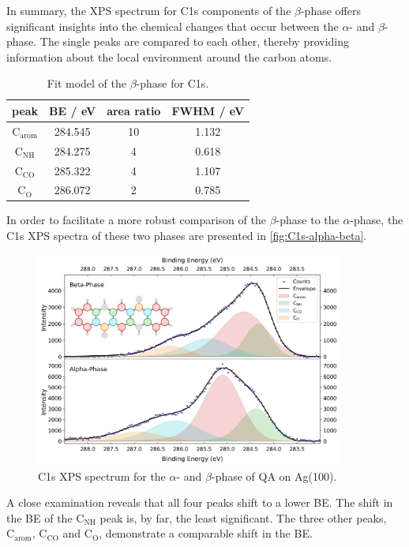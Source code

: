 In summary, the \ac{XPS} spectrum for C1s components of the $\beta$-phase offers significant insights into the chemical changes that occur between the $\alpha$- and $\beta$-phase. The single peaks are compared to each other, thereby providing information about the local environment around the carbon atoms.

\begin{table}[H]
	\centering
	\caption{Fit model of the $\beta$-phase for C1s.}
	\begin{tabular}{|c|c|c|c|}
		\hline
		peak & \ac{BE} / eV & area ratio & FWHM / eV \\
		\hline
		$\mathrm{C_{arom}}$ & 284.545 & 10 & 1.132 \\ \hline
		$\mathrm{C_{NH}}$ & 284.275 & 4 & 0.618 \\ \hline
		$\mathrm{C_{CO}}$ & 285.322 & 4 & 1.107 \\ \hline
		$\mathrm{C_{O}}$ & 286.072 & 2 & 0.785 \\ \hline
	\end{tabular}
	\label{tab:C1s-beta-fit}
\end{table}

In order to facilitate a more robust comparison of the $\beta$-phase to the $\alpha$-phase, the C1s \ac{XPS} spectra of these two phases are presented in \autoref{fig:C1s-alpha-beta}.

\begin{figure}[H]
	\centering
	\includegraphics[width=0.9\textwidth]{images/C1s-phase-comparison.png}
	\caption{C1s \ac{XPS} spectrum for the $\alpha$- and $\beta$-phase  of \ac{QA} on Ag(100).}
	\label{fig:C1s-alpha-beta}
\end{figure}

A close examination reveals that all four peaks shift to a lower \ac{BE}. The shift in the \ac{BE} of the $\mathrm{C_{NH}}$ peak is, by far, the least significant. The three other peaks, $\mathrm{C_{arom}}$, $\mathrm{C_{CO}}$ and $\mathrm{C_{O}}$, demonstrate a comparable shift in the \ac{BE}.

